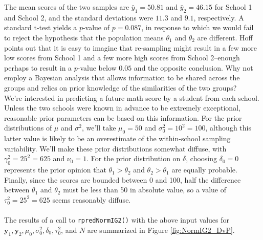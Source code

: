 \documentclass[12pt, a4paper]{article}
\begin{document}
\noindent The mean scores of the two samples are $\bar{y}_1 = 50.81$ and $\bar{y}_2 = 46.15$ for School 1 and School 2, and the standard deviations were $11.3$ and $9.1$, respectively.  A standard t-test yields a $p$-value of $p = 0.087$, in response to which we would fail to reject the hypothesis that the population means $\theta_1$ and $\theta_2$ are different. Hoff points out that it is easy to imagine that re-sampling might result in a few more low scores from School 1 and a few more high scores from School 2--enough perhaps to result in a $p$-value below $0.05$ and the opposite conclusion. Why not employ a Bayesian analysis that allows information to be shared across the groups and relies on prior knowledge of the similarities of the two groups?\\

\noindent We're interested in predicting a future math score by a student from each school.  Unless the two schools were known in advance to be extremely exceptional, reasonable prior parameters can be based on this information.  For the prior distributions of $\mu$ and $\sigma^2$, we'll take $\mu_0 = 50$ and $\sigma^2_0 = 10^2 = 100$, although this latter value is likely to be an overestimate of the within-school sampling variability.  We'll make these prior distributions somewhat diffuse, with $\gamma^2_0 = 25^2 = 625$ and $\nu_0 = 1$.  For the prior distribution on $\delta$, choosing $\delta_0 = 0$ represents the prior opinion that $\theta_1 > \theta_2$ and $\theta_2 > \theta_1$ are equally probable.  Finally, since the scores are bounded between 0 and 100, half the difference between $\theta_1$ and $\theta_2$ must be less than 50 in absolute value, so a value of $\tau^2_0 = 25^2 = 625$ seems reasonably diffuse.\\\\

\noindent The results of a call to \texttt{rpredNormIG2()} with the above input values for $\mathbf{y}_1,\mathbf{y}_2,\mu_0,\sigma^2_0,\delta_0,\tau^2_0$, and $N$ are summarized in Figure \ref{fig:NormIG2_DvP}.\\
\end{document}

